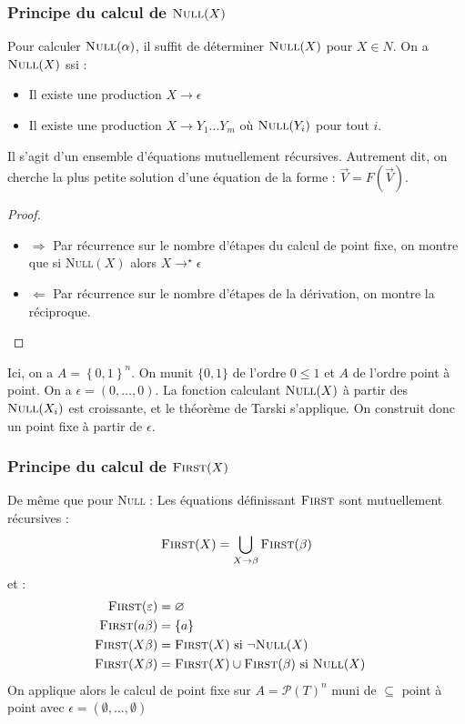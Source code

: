 \documentclass{cours}
\begin{document}
\subsubsection{Principe du calcul de $\textsc{Null}(X)$} 
\begin{proposition}
    Pour calculer $\textsc{Null}(\alpha)$, il suffit de déterminer $\textsc{Null}(X)$ pour $X\in N$.
    On a $\textsc{Null}(X)$ ssi : 
    \begin{itemize}
        \item Il existe une production $X \rightarrow \epsilon$
        \item Il existe une production $X \rightarrow Y_{1}\ldots Y_{m}$ où $\textsc{Null}(Y_{i})$ pour tout $i$.
    \end{itemize}
    Il s'agit d'un ensemble d'équations mutuellement récursives. Autrement dit, on cherche la plus petite solution d'une équation de la forme : $\vec{V} = F(\vec{V})$.
\end{proposition}
\begin{proof}
    \begin{itemize}
        \item $\Rightarrow$ Par récurrence sur le nombre d'étapes du calcul de point fixe, on montre que si \textsc{Null}$(X)$ alors $X \rightarrow^{\star}\epsilon$
        \item $\Leftarrow$ Par récurrence sur le nombre d'étapes de la dérivation, on montre la réciproque.
    \end{itemize}
\end{proof}
Ici, on a $A = \left\{0, 1\right\}^{n}$. On munit $\{0, 1\}$ de l'ordre $0 \leq 1$ et $A$ de l'ordre point à point. On a $\epsilon = (0, \ldots, 0)$. La fonction calculant $\textsc{Null}(X)$ à partir des $\textsc{Null}(X_{i})$ est croissante, et le théorème de Tarski s'applique. On construit donc un point fixe à partir de $\epsilon$.

\subsubsection{Principe du calcul de $\textsc{First}(X)$}
De même que pour \textsc{Null} : Les équations définissant $\textsc{First}$ sont mutuellement récursives : 
\[
    \textsc{First}(X) = \bigcup_{X \rightarrow \beta} \textsc{First}(\beta)    
\]
et :  
\begin{equation*}
    \begin{aligned}
        \textsc{First}(\epsilon) &= \emptyset&\\
        \textsc{First}(a\beta) &= \left\{a\right\}&\\
        \textsc{First}(X\beta) &= \textsc{First}(X) \text{ si } \lnot\textsc{Null}(X)&\\
        \textsc{First}(X\beta) &= \textsc{First}(X) \cup \textsc{First}(\beta) \text{ si } \textsc{Null}(X)&
    \end{aligned}
\end{equation*}
On applique alors le calcul de point fixe sur $A = \mathcal{P}(T)^{n}$ muni de $\subseteq$ point à point avec $\epsilon = (\emptyset, \ldots, \emptyset)$
\end{document}
